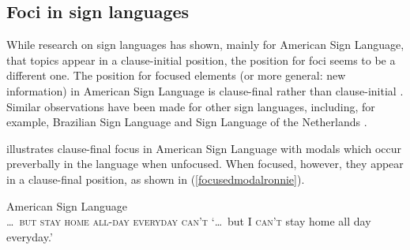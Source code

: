 \begin{table}
\caption{Some differences between contrastive and information focus (based on \citealt{kiss1998identificational})\label{ldhtdiff}}
\end{table}


\subsection{Foci in sign languages}
While research on sign languages has shown, mainly for American Sign Language, that topics appear in a clause-initial position, the position for foci seems to be a different one. The position for focused elements (or more general: new information) in American Sign Language is clause-final rather than clause-initial \citep{wilbur1991intonation, wilbur1994foregrounding, wilbur1996evidence, wilbur1997prosodic}. Similar observations have been made for other sign languages, including, for example, Brazilian Sign Language \citep{de1999phrase} and Sign Language of the Netherlands \citep{crasbornkoijiros2012}.

\citet[92]{wilbur1997prosodic} illustrates clause-final focus in American Sign Language with modals which occur preverbally in the language when unfocused. When focused, however, they appear in a clause-final position, as shown in (\ref{focusedmodalronnie}).

\begin{exe}
\ex American Sign Language \citep[92]{wilbur1997prosodic} \\ %
{\textsc{\dots\ but stay home all-day everyday can't}}
\glt `\dots\ but I \textsc{can't} stay home all day everyday.' \label{focusedmodalronnie}
\end{exe}

